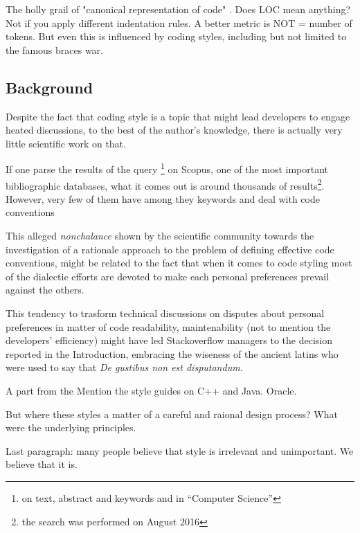 The holly grail of "canonical representation of code" .
Does LOC mean anything?
Not if you apply different indentation rules.
A better metric is NOT = number of tokens.
But even this is influenced by coding styles, including but
not limited to the famous braces war.

\subsection{Background}

Despite the fact that coding style is a topic that might lead developers to engage heated 
discussions, to the best of the author's knowledge, there is actually very little scientific 
work on that. 

If one parse the results of the query 
\footnote{on text, abstract and keywords and in ``Computer Science''} 
on Scopus, one of the most important bibliographic databases, what it comes out is around 
thousands of results\footnote{the search was performed on August 2016}. 
However, very few of them  have  among they
keywords and deal with code conventions

This alleged \emph{nonchalance} shown by the scientific community towards the investigation 
of a rationale approach to the problem of defining effective code conventions, might be 
related to the fact that when it comes to code styling most of the dialectic efforts are devoted
to make each personal preferences prevail against the others.

This tendency to trasform technical discussions on disputes about personal preferences 
in matter of code readability, maintenability (not to mention the developers' efficiency) might 
have led Stackoverflow managers to the decision reported in the Introduction, embracing the 
wiseness of the ancient latins who were used to say that \emph{De gustibus non est disputandum}.


A part from the Mention the style guides on C++ and Java. Oracle.

But where these styles a matter of a careful and raional design process?
What were the underlying principles.

Last paragraph: many people believe that style is irrelevant and unimportant.
We believe that it is.


